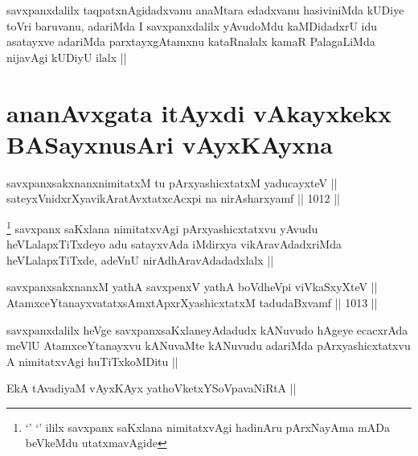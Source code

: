 \begin{artha}
savxpanxdalilx taqpatxnAgidadxvanu anaMtara edadxvanu hasiviniMda kUDiye toVri baruvanu, adariMda I savxpanxdalilx yAvudoMdu kaMDidadxrU idu asatayxve adariMda parxtayxgAtamxnu kataRnalalx kamaR PalagaLiMda nijavAgi kUDiyU ilalx ||
\end{artha}

\section*{ananAvxgata itAyxdi vAkayxkekx BASayxnusAri vAyxKAyxna}


\begin{shl}
savxpanxsakxnanxnimitatxM tu pArxyashicxtatxM yaducayxteV || \\
sateyxVnidxrXyavikAratAvxtatxcAcxpi na nirAsharxyamf ||  1012 ||  
\end{shl}

\begin{artha}
\footnote{`\stext' `\stext' ililx savxpanx saKxlana nimitatxvAgi hadinAru pArxNayAma mADa beVkeMdu utatxmavAgide}
savxpanx saKxlana nimitatxvAgi pArxyashicxtatxvu yAvudu heVLalapxTiTxdeyo adu satayxvAda iMdirxya vikAravAdadxriMda heVLalapxTiTxde, adeVnU nirAdhAravAdadadxlalx ||
\end{artha}


\begin{shl}
savxpanxsakxnanxM yathA savxpenxV yathA boVdheV\s pi viVkaSxyXteV || \\
AtamxceYtanayxvatatxsAmxtApxrXyashicxtatxM tadudaBxvamf ||  1013 || 
\end{shl}

\begin{artha}
savxpanxdalilx heVge savxpanxsaKxlaneyAdadudx kANuvudo hAgeye ecacxrAda meVlU AtamxceYtanayxvu kANuvaMte kANuvudu adariMda pArxyashicxtatxvu A nimitatxvAgi huTiTxkoMDitu ||
\end{artha}


\begin{shl}
EkA tAvadiyaM vAyxKAyx yathoVketxYSoVpavaNiRtA || 
\end{shl}

